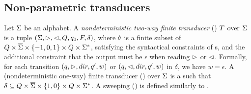 \subsection{Non-parametric transducers}
\begin{definition}
    Let $\Sigma$ be an alphabet. A \emph{nondeterministic two-way finite  transducer} (\FFT{}) $T$  over $\Sigma$ is a tuple $(\Sigma, \vartriangleright, \vartriangleleft, Q, q_0, F, \delta)$, where $\delta$ is  a finite subset of $Q \times \overline{\Sigma}\times \{-1, 0, 1\}\times 
    Q \times \Sigma^*$, satisfying the syntactical constraints of \FFA{}s, and the additional constraint that the output must be $\epsilon$ when reading $\vartriangleright$ or $\vartriangleleft$. Formally, for each transition $(q, \vartriangleright, dir, q', w)$ or $(q, \vartriangleleft, dir, q', w)$ in $\delta$, we have $w=\epsilon$.
%
%
%
A (nondeterministic one-way) finite transducer (\FT{}) over
    $\Sigma$ is a \FFT{} such that $\delta \subseteq Q \times \overline{\Sigma} \times
    \{1,0\} \times Q \times \Sigma^*$.
A sweeping \FFT{} (\SFFT{}) is defined similarly to \SFFA.
\end{definition}
